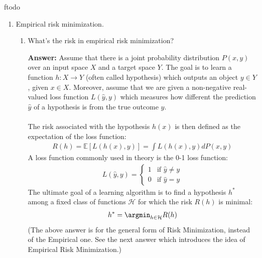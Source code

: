ƒtodo\documentclass{article}
\newenvironment{QandA}{\begin{enumerate}[label=\arabic*.]}{\end{enumerate}}
\newenvironment{InnerQandA}{\begin{enumerate}[label=\roman*.]}{\end{enumerate}}
\newenvironment{answer}{\par\normalfont \textbf{Answer:}}{}
\newcommand{\Exp}[1]{\mathbb{E}\left[ #1 \right]}
\begin{document}
\begin{QandA}
\begin{answer}
        \textit{Active learning} is a branch of machine learning where a learning algorithm can interactively query a user (or some other information source) to label new data points with the desired outputs. (Source: \href{https://en.wikipedia.org/wiki/Active_learning}{Wikipedia}) \\\\
        \textit{Self-supervised learning} is a branch of machine learning that learns from unlabeled data by automatically extracting labels from the sample. For example, we could mask out a word in a sentence, which the algorithm then has to predict. (Source: \href{https://en.wikipedia.org/wiki/Self-supervised_learning}{Wikipedia})
    \end{answer}

    \item Empirical risk minimization.
    \begin{InnerQandA}
        \item What’s the risk in empirical risk minimization? 
        \begin{answer}
            Assume that there is a joint probability distribution $P(x, y)$ over an input space $X$ and a target space $Y$. The goal is to learn a function $h: X \rightarrow Y$ (often called hypothesis) which outputs an object $y \in Y$, given $x \in X$. Moreover, assume that we are given a non-negative real-valued loss function $L(\hat{y}, y)$ which measures how different the prediction $\hat{y}$ of a hypothesis is from the true outcome $y$. \\\\
            The risk associated with the hypothesis $h(x)$ is then defined as the expectation of the loss function:
            \begin{align*}
                R(h) = \Exp{L(h(x), y)} = \int L(h(x), y) dP(x, y)
            \end{align*}
            A loss function commonly used in theory is the 0-1 loss function:
            \begin{align*}
                L(\hat{y}, y) = \begin{cases}
                    1 &\text{if } \hat{y} \neq y \\
                    0 &\text{if } \hat{y} = y
                \end{cases}
            \end{align*}
            The ultimate goal of a learning algorithm is to find a hypothesis $h^*$ among a fixed class of functions $\mathcal{H}$ for which the risk $R(h)$ is minimal:
            \begin{align*}
                h^* = \argmin_{h \in \mathcal{H}} R(h)
            \end{align*}
            (The above answer is for the general form of Risk Minimization, instead of the Empirical one. See the next answer which introduces the idea of Empirical Risk Minimization.)
        \end{answer}


\end{InnerQandA}
\end{QandA}
\end{document}

